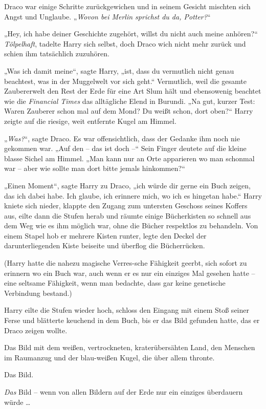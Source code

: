 {Draco war einige Schritte zurückgewichen und in seinem Gesicht mischten sich Angst und Unglaube. „\emph{Wovon bei Merlin sprichst du da, Potter?}“

„Hey, ich habe deiner Geschichte zugehört, willst du nicht auch meine anhören?“ \emph{Tölpelhaft}, tadelte Harry sich selbst, doch Draco wich nicht mehr zurück und schien ihm tatsächlich zuzuhören.

„Was ich damit meine“, sagte Harry, „ist, dass du vermutlich nicht genau beachtest, was in der Muggelwelt vor sich geht.“ Vermutlich, weil die gesamte Zaubererwelt den Rest der Erde für eine Art Slum hält und ebensowenig beachtet wie die \emph{Financial Times} das alltägliche Elend in Burundi. „Na gut, kurzer Test: Waren Zauberer schon mal auf dem Mond? Du weißt schon, dort oben?“ Harry zeigte auf die riesige, weit entfernte Kugel am Himmel.

„\emph{Was?}“, sagte Draco. Es war offensichtlich, dass der Gedanke ihm noch nie gekommen war. „Auf den -- das ist doch --“ Sein Finger deutete auf die kleine blasse Sichel am Himmel. „Man kann nur an Orte apparieren wo man schonmal war -- aber wie sollte man dort bitte jemals hinkommen?“

„Einen Moment“, sagte Harry zu Draco, „ich würde dir gerne ein Buch zeigen, das ich dabei habe. Ich glaube, ich erinnere mich, wo ich es hingetan habe.“ Harry kniete sich nieder, klappte den Zugang zum untersten Geschoss seines Koffers aus, eilte dann die Stufen herab und räumte einige Bücherkisten so schnell aus dem Weg wie es ihm möglich war, ohne die Bücher respektlos zu behandeln. Von einem Stapel hob er mehrere Kisten runter, legte den Deckel der darunterliegenden Kiste beiseite und überflog die Bücherrücken.

(Harry hatte die nahezu magische Verres-sche Fähigkeit geerbt, sich sofort zu erinnern wo ein Buch war, auch wenn er es nur ein einziges Mal gesehen hatte -- eine seltsame Fähigkeit, wenn man bedachte, dass gar keine genetische Verbindung bestand.)

Harry eilte die Stufen wieder hoch, schloss den Eingang mit einem Stoß seiner Ferse und blätterte keuchend in dem Buch, bis er das Bild gefunden hatte, das er Draco zeigen wollte.

Das Bild mit dem weißen, vertrockneten, kraterübersähten Land, den Menschen im Raumanzug und der blau-weißen Kugel, die über allem thronte.

Das Bild.

\emph{Das} Bild -- wenn von allen Bildern auf der Erde nur ein einziges überdauern würde …

}
